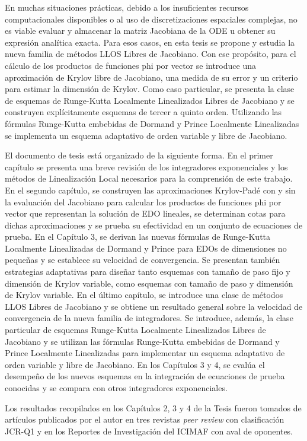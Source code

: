 En muchas situaciones prácticas, debido a los insuficientes recursos computacionales disponibles o al uso de discretizaciones espaciales complejas, no es viable evaluar y almacenar la matriz Jacobiana de la ODE u obtener su expresión analítica exacta. Para esos casos, en esta tesis se propone y estudia la nueva familia de métodos LLOS Libres de Jacobiano. Con ese propósito, para el cálculo de los productos de funciones phi por vector se introduce una aproximación de Krylov libre de Jacobiano, una medida de su error y un criterio para estimar la dimensión de Krylov. Como caso particular, se presenta la clase de esquemas de Runge-Kutta Localmente Linealizados Libres de Jacobiano y se construyen explícitamente esquemas de tercer a quinto orden. Utilizando las  fórmulas Runge-Kutta embebidas de Dormand y Prince Localmente Linealizadas se implementa un esquema adaptativo de orden variable y libre de Jacobiano.

El documento de tesis está organizado de la siguiente forma. En el primer capítulo se presenta una breve revisión de los integradores exponenciales y los métodos de Linealización Local necesarios para la comprensión de este trabajo. En el segundo capítulo, se construyen las aproximaciones Krylov-Padé con y sin la evaluación del Jacobiano para calcular los productos de funciones phi por vector que representan la solución de EDO lineales, se determinan cotas para dichas aproximaciones y se prueba su efectividad en un conjunto de ecuaciones de prueba. En el Capítulo 3, se derivan las nuevas fórmulas de Runge-Kutta Localmente Linealizadas de Dormand y Prince para EDOs de dimensiones no pequeñas y se establece su velocidad de convergencia. Se presentan también estrategias adaptativas para diseñar tanto esquemas con tamaño de paso fijo y dimensión de Krylov variable, como esquemas con tamaño de paso y dimensión de Krylov variable. En el último capítulo, se introduce una clase de métodos LLOS Libres de Jacobiano y se obtiene un resultado general sobre la velocidad de convergencia de la nueva familia de integradores. Se introduce, además, la clase particular de esquemas Runge-Kutta Localmente Linealizados Libres de Jacobiano y se utilizan las fórmulas Runge-Kutta embebidas de Dormand y Prince Localmente Linealizadas para implementar un esquema adaptativo de orden variable y libre de Jacobiano.
En los Capítulos 3 y 4, se evalúa el desempeño de los nuevos esquemas en la integración de ecuaciones de prueba conocidas y se compara con otros integradores exponenciales.

Los resultados recopilados en los Capítulos 2, 3 y 4 de la Tesis fueron tomados de artículos \cite{naranjo2021locally,naranjo2023jacobian,naranjo2023computing} publicados por el autor en tres revistas \textit{peer review} con clasificación JCR-Q1 y en los Reportes de Investigación del ICIMAF \cite{naranjo2022RT,naranjo2023RT} con aval de oponentes.
